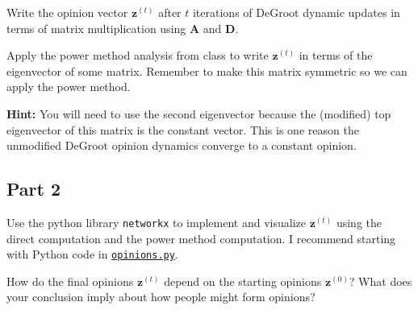 \documentclass{article}
\begin{document}
Write the opinion vector $\mathbf{z}^{(t)}$ after $t$ iterations of DeGroot dynamic updates in terms of matrix multiplication using $\mathbf{A}$ and $\mathbf{D}$.

Apply the power method analysis from class to write $\mathbf{z}^{(t)}$ in terms of the eigenvector of some matrix. Remember to make this matrix symmetric so we can apply the power method.

\textbf{Hint:} You will need to use the second eigenvector because the (modified) top eigenvector of this matrix is the constant vector. This is one reason the unmodified DeGroot opinion dynamics converge to a constant opinion.

\subsection*{Part 2}
Use the python library \texttt{networkx} to implement and visualize $\mathbf{z}^{(t)}$ using the direct computation and the power method computation. I recommend starting with Python code in \href{https://www.rtealwitter.com/rads2024/psets/opinions.py}{\texttt{opinions.py}}.

How do the final opinions $\mathbf{z}^{(t)}$ depend on the starting opinions $\mathbf{z}^{(0)}$? What does your conclusion imply about how people might form opinions?

%
\end{document}
